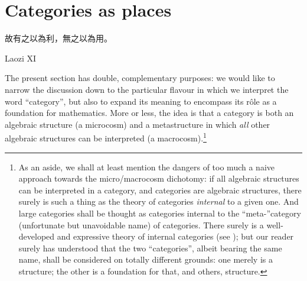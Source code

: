\section{Categories as places}\label{as_places}
\epigraph{\begin{CJK}{UTF8}{bsmi} 故有之以為利，無之以為用。 \end{CJK}}{Laozi XI}
The present section has double, complementary purposes: we would like to narrow the discussion down to the particular flavour in which we interpret the word ``category'', but also to expand its meaning to encompass its r\^ole as a foundation for mathematics. More or less, the idea is that a category is both an algebraic structure (a microcosm) and a metastructure in which \emph{all} other algebraic structures can be interpreted (a macrocosm).\footnote{As an aside, we shall at least mention the dangers of too much a naive approach towards the micro/macrocosm dichotomy: if all algebraic structures can be interpreted in a category, and categories are algebraic structures, there surely is such a thing as the theory of categories \emph{internal} to a given one. And large categories shall be thought as categories internal to the ``meta-''category (unfortunate but unavoidable name) of categories. There surely is a well-developed and expressive theory of internal categories (see \cite[8]{Bor1}); but our reader surely has understood that the two ``categories'', albeit bearing the same name, shall be considered on totally different grounds: one merely is a structure; the other is a foundation for that, and others, structure.}

